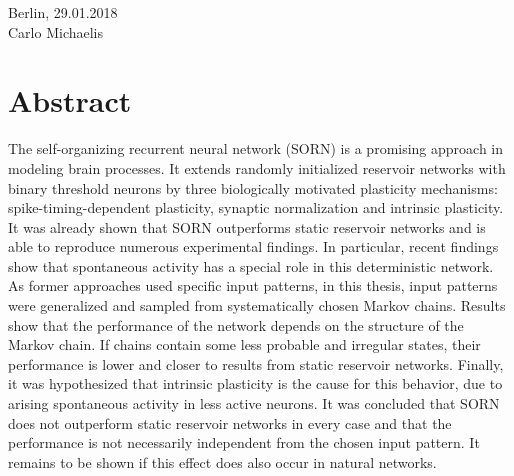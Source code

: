 \documentclass[12pt]{article}
\begin{document}
\vspace{3em}
\noindent Berlin, 29.01.2018\\ Carlo Michaelis
\newpage

\section*{Abstract}

The self-organizing recurrent neural network (SORN) is a promising approach in modeling brain processes. It extends randomly initialized reservoir networks with binary threshold neurons by three biologically motivated plasticity mechanisms: spike-timing-dependent plasticity, synaptic normalization and intrinsic plasticity. It was already shown that SORN outperforms static reservoir networks and is able to reproduce numerous experimental findings. In particular, recent findings show that spontaneous activity has a special role in this deterministic network. As former approaches used specific input patterns, in this thesis, input patterns were generalized and sampled from systematically chosen Markov chains. Results show that the performance of the network depends on the structure of the Markov chain. If chains contain some less probable and irregular states, their performance is lower and closer to results from static reservoir networks. Finally, it was hypothesized that intrinsic plasticity is the cause for this behavior, due to arising spontaneous activity in less active neurons. It was concluded that SORN does not outperform static reservoir networks in every case and that the performance is not necessarily independent from the chosen input pattern. It remains to be shown if this effect does also occur in natural networks.

\newpage

\tableofcontents
\newpage

{}
\listoffigures
\newpage

{}
\listoftables
\newpage

{}

\newpage

{}
\printnomenclature



















{}
\printbibliography
\end{document}
